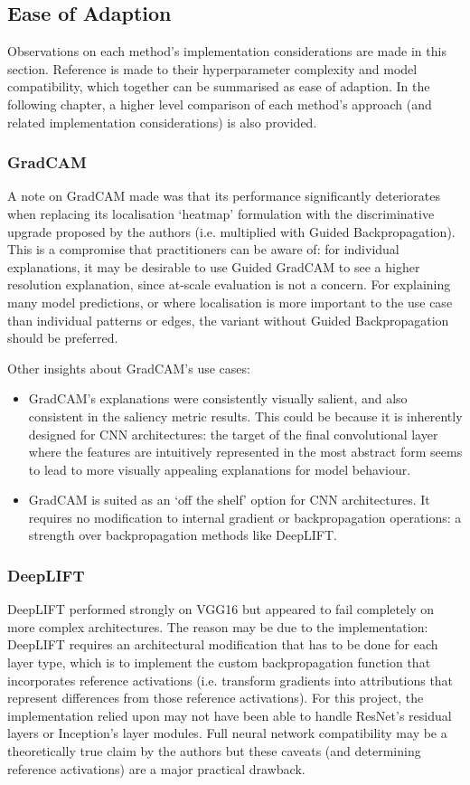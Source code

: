 \documentclass[main]{subfiles}
\begin{document}
\newpage
\subsection{Ease of Adaption} \label{sec:compatibility}
Observations on each method's implementation considerations are made in this section. Reference is made to their hyperparameter complexity and model compatibility, which together can be summarised as ease of adaption. In the following chapter, a higher level comparison of each method's approach (and related implementation considerations) is also provided.

\subsubsection{GradCAM}
A note on GradCAM made was that its performance significantly deteriorates when replacing its localisation `heatmap' formulation with the discriminative upgrade proposed by the authors (i.e. multiplied with Guided Backpropagation). This is a compromise that practitioners can be aware of: for individual explanations, it may be desirable to use Guided GradCAM to see a higher resolution explanation, since at-scale evaluation is not a concern. For explaining many model predictions, or where localisation is more important to the use case than individual patterns or edges, the variant without Guided Backpropagation should be preferred.

\noindent Other insights about GradCAM's use cases:
\begin{itemize}
\item GradCAM's explanations were consistently visually salient, and also consistent in the saliency metric results. This could be because it is inherently designed for CNN architectures: the target of the final convolutional layer where the features are intuitively represented in the most abstract form seems to lead to more visually appealing explanations for model behaviour.
\item GradCAM is suited as an `off the shelf' option for CNN architectures. It requires no modification to internal gradient or backpropagation operations: a strength over backpropagation methods like DeepLIFT.
\end{itemize}


\subsubsection{DeepLIFT}

DeepLIFT performed strongly on VGG16 but appeared to fail completely on more complex architectures. The reason may be due to the implementation: DeepLIFT requires an architectural modification that has to be done for each layer type, which is to implement the custom backpropagation function that incorporates reference activations (i.e. transform gradients into attributions that represent differences from those reference activations). For this project, the implementation relied upon may not have been able to handle ResNet's residual layers or Inception's layer modules. Full neural network compatibility may be a theoretically true claim by the authors but these caveats (and determining reference activations) are a major practical drawback.
\end{document}
